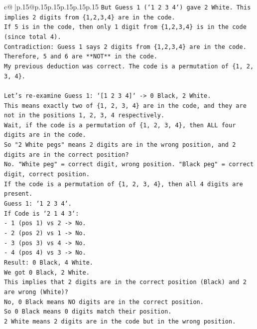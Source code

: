 \documentclass{article}
\begin{document}
{\begin{supertabular}{c@{$\;$}|p{.15\linewidth}@{}p{.15\linewidth}p{.15\linewidth}p{.15\linewidth}p{.15\linewidth}p{.15\linewidth}}
{{{\texttt{But Guess 1 (`1 2 3 4`) gave 2 White. This implies 2 digits from \{1,2,3,4\} are in the code.} \\
\texttt{If 5 is in the code, then only 1 digit from \{1,2,3,4\} is in the code (since total 4).} \\
\texttt{Contradiction: Guess 1 says 2 digits from \{1,2,3,4\} are in the code.} \\
\texttt{Therefore, 5 and 6 are **NOT** in the code.} \\
\texttt{My previous deduction was correct. The code is a permutation of \{1, 2, 3, 4\}.} \\
\\ 
\texttt{Let's re{-}examine Guess 1: `{[}1 2 3 4{]}` {-}> 0 Black, 2 White.} \\
\texttt{This means exactly two of \{1, 2, 3, 4\} are in the code, and they are not in the positions 1, 2, 3, 4 respectively.} \\
\texttt{Wait, if the code is a permutation of \{1, 2, 3, 4\}, then ALL four digits are in the code.} \\
\texttt{So "2 White pegs" means 2 digits are in the wrong position, and 2 digits are in the correct position?} \\
\texttt{No. "White peg" = correct digit, wrong position. "Black peg" = correct digit, correct position.} \\
\texttt{If the code is a permutation of \{1, 2, 3, 4\}, then all 4 digits are present.} \\
\texttt{Guess 1: `1 2 3 4`.} \\
\texttt{If Code is `2 1 4 3`:} \\
\texttt{{-} 1 (pos 1) vs 2 {-}> No.} \\
\texttt{{-} 2 (pos 2) vs 1 {-}> No.} \\
\texttt{{-} 3 (pos 3) vs 4 {-}> No.} \\
\texttt{{-} 4 (pos 4) vs 3 {-}> No.} \\
\texttt{Result: 0 Black, 4 White.} \\
\texttt{We got 0 Black, 2 White.} \\
\texttt{This implies that 2 digits are in the correct position (Black) and 2 are wrong (White)?} \\
\texttt{No, 0 Black means NO digits are in the correct position.} \\
\texttt{So 0 Black means 0 digits match their position.} \\
\texttt{2 White means 2 digits are in the code but in the wrong position.} \\
}}}
\end{supertabular}}
\end{document}
